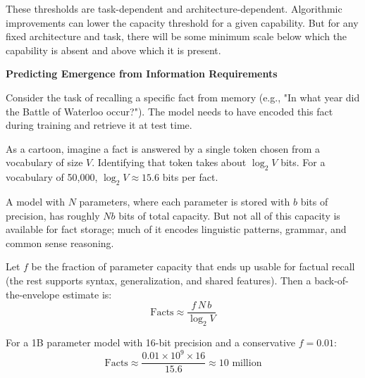 These thresholds are task-dependent and architecture-dependent. Algorithmic improvements can lower the capacity threshold for a given capability. But for any fixed architecture and task, there will be some minimum scale below which the capability is absent and above which it is present.

\vspace{1.5em}

\begin{examplebox}
\textbf{Predicting Emergence from Information Requirements}

\vspace{0.5em}

Consider the task of recalling a specific fact from memory (e.g., "In what year did the Battle of Waterloo occur?"). The model needs to have encoded this fact during training and retrieve it at test time.

\vspace{0.5em}

As a cartoon, imagine a fact is answered by a single token chosen from a vocabulary of size $V$. Identifying that token takes about $\log_2 V$ bits. For a vocabulary of 50,000, $\log_2 V \approx 15.6$ bits per fact.

\vspace{0.5em}

A model with $N$ parameters, where each parameter is stored with $b$ bits of precision, has roughly $Nb$ bits of total capacity. But not all of this capacity is available for fact storage; much of it encodes linguistic patterns, grammar, and common sense reasoning.

\vspace{0.5em}

Let $f$ be the fraction of parameter capacity that ends up usable for factual recall (the rest supports syntax, generalization, and shared features). Then a back-of-the-envelope estimate is:
\begin{equation}
\text{Facts} \approx \frac{f \, N \, b}{\log_2 V}
\end{equation}

\vspace{0.5em}

For a 1B parameter model with 16-bit precision and a conservative $f = 0.01$:
\begin{equation}
\text{Facts} \approx \frac{0.01 \times 10^9 \times 16}{15.6} \approx 10 \text{ million}
\end{equation}

\vspace{0.5em}


\end{examplebox}
